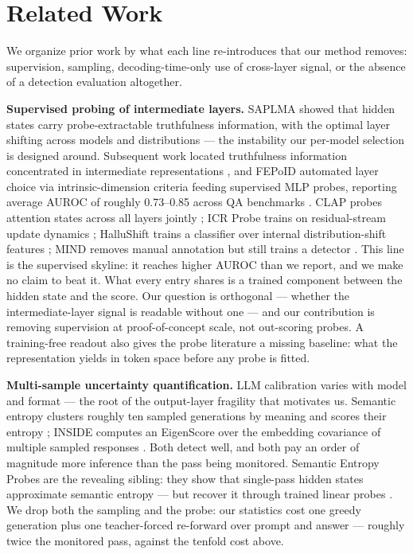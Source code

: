 \section{Related Work}
\label{sec:related}

We organize prior work by what each line re-introduces that our method removes: supervision, sampling, decoding-time-only use of cross-layer signal, or the absence of a detection evaluation altogether.

\textbf{Supervised probing of intermediate layers.} SAPLMA showed that hidden states carry probe-extractable truthfulness information, with the optimal layer shifting across models and distributions \citep{Azaria2023Internal} --- the instability our per-model selection is designed around. Subsequent work located truthfulness information concentrated in intermediate representations \citep{Orgad2024LLMs}, and FEPoID automated layer choice via intrinsic-dimension criteria feeding supervised MLP probes, reporting average AUROC of roughly 0.73--0.85 across QA benchmarks \citep{Wang2026Automatic}. CLAP probes attention states across all layers jointly \citep{Suresh2025Cross}; ICR Probe trains on residual-stream update dynamics \citep{Zhang2025ICR}; HalluShift trains a classifier over internal distribution-shift features \citep{Dasgupta2025HalluShift}; MIND removes manual annotation but still trains a detector \citep{Su2024Unsupervised}. This line is the supervised skyline: it reaches higher AUROC than we report, and we make no claim to beat it. What every entry shares is a trained component between the hidden state and the score. Our question is orthogonal --- whether the intermediate-layer signal is readable without one --- and our contribution is removing supervision at proof-of-concept scale, not out-scoring probes. A training-free readout also gives the probe literature a missing baseline: what the representation yields in token space before any probe is fitted.

\textbf{Multi-sample uncertainty quantification.} LLM calibration varies with model and format \citep{Kadavath2022Language} --- the root of the output-layer fragility that motivates us. Semantic entropy clusters roughly ten sampled generations by meaning and scores their entropy \citep{Farquhar2024Detecting}; INSIDE computes an EigenScore over the embedding covariance of multiple sampled responses \citep{Chen2024INSIDE}. Both detect well, and both pay an order of magnitude more inference than the pass being monitored. Semantic Entropy Probes are the revealing sibling: they show that single-pass hidden states approximate semantic entropy --- but recover it through trained linear probes \citep{Kossen2024Semantic}. We drop both the sampling and the probe: our statistics cost one greedy generation plus one teacher-forced re-forward over prompt and answer --- roughly twice the monitored pass, against the tenfold cost above.

